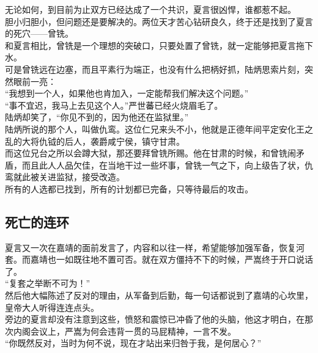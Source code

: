 \begin{multicols}{\theparacolNo}
无论如何，到目前为止双方已经达成了一个共识，夏言很凶悍，谁都惹不起。\\

胆小归胆小，但问题还是要解决的。两位天才苦心钻研良久，终于还是找到了夏言的死穴——曾铣。\\

和夏言相比，曾铣是一个理想的突破口，只要处置了曾铣，就一定能够把夏言拖下水。\\

可是曾铣远在边塞，而且平素行为端正，也没有什么把柄好抓，陆炳思索片刻，突然眼前一亮：\\

“我想到一个人，如果他也肯加入，一定能帮我们解决这个问题。”\\

“事不宜迟，我马上去见这个人。”严世蕃已经火烧眉毛了。\\

陆炳却笑了，“你见不到的，因为他还在监狱里。”\\

陆炳所说的那个人，叫做仇鸾。这位仁兄来头不小，他就是正德年间平定安化王之乱的大将仇钺的后人，袭爵咸宁侯，镇守甘肃。\\

而这位兄台之所以会蹲大狱，那还要拜曾铣所赐。他在甘肃的时候，和曾铣闹矛盾，而且此人人品欠佳，在当地干过一些坏事，曾铣一气之下，向上级告了状，仇鸾就此被关进监狱，接受改造。\\

所有的人选都已找到，所有的计划都已完备，只等待最后的攻击。\\

\subsection{死亡的连环}
夏言又一次在嘉靖的面前发言了，内容和以往一样，希望能够加强军备，恢复河套。而嘉靖也一如既往地不置可否。就在双方僵持不下的时候，严嵩终于开口说话了。\\

“复套之举断不可为！”\\

然后他大幅陈述了反对的理由，从军备到后勤，每一句话都说到了嘉靖的心坎里，皇帝大人听得连连点头。\\

旁边的夏言却没有注意到这些，愤怒和震惊已冲昏了他的头脑，他这才明白，在那次内阁会议上，严嵩为何会违背一贯的马屁精神，一言不发。\\

“你既然反对，当时为何不说，现在才站出来归咎于我，是何居心？”\\


\end{multicols}
